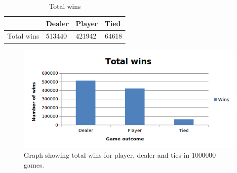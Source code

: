 
\begin{table}[H]
    \caption{Total wins}
\begin{tabular}{|l|l|l|l|}
\hline
 & Dealer & Player & Tied \\ \hline
Total wins &  513440 & 421942 & 64618\\ \hline
\end{tabular}
\end{table}

\begin{figure}[H]
  \centering
  \includegraphics[width=\linewidth]{fig/GraphTotalWins.png}
  \caption{Graph showing total wins for player, dealer and ties in 1000000 games.}
\end{figure}